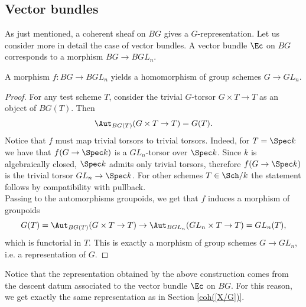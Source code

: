 \subsection{Vector bundles}

As just mentioned, a coherent sheaf on $BG$ gives a $G$-representation. Let us consider more in detail the case of vector bundles.
A vector bundle $\Ec$ on $BG$ corresponds to a morphism $BG \to BGL_n$.

\begin{rmk}
A morphism $f \colon BG \to BGL_n$ yields a homomorphism of group schemes $G \to GL_n$.
\end{rmk}
\begin{proof}
    For any test scheme $T$, consider the trivial $G$-torsor $G \times T \to T$ as an object of $BG(T)$. Then
    \[
    \Aut_{BG(T)}(G \times T \to T) = G(T).
    \]
    Notice that $f$ must map trivial torsors to trivial torsors.
	Indeed, for $T = \Spec k$ we have that $f(G \to \Spec k)$ is a $GL_n$-torsor over $\Spec k$. Since $k$ is algebraically closed, $\Spec k$ admits only trivial torsors, therefore $f(G \to \Spec k)$ is the trivial torsor $GL_n \to \Spec k$. For other schemes $T \in \Sch/k$ the statement follows by compatibility with pullback.\\
    Passing to the automorphisms groupoids, we get that $f$ induces a morphism of groupoids
    \[
    G(T) = \Aut_{BG(T)}(G \times T \to T) \to \Aut_{BGL_n}(GL_n \times T \to T ) = GL_n(T),
    \]
    which is functorial in $T$. This is exactly a morphism of group schemes $G \to GL_n$, i.e. a representation of $G$.
\end{proof}

\begin{rmk}
Notice that the representation obtained by the above construction comes from the descent datum associated to the vector bundle $\Ec$ on $BG$. For this reason, we get exactly the same representation as in Section \ref{coh([X/G])}.
\end{rmk}